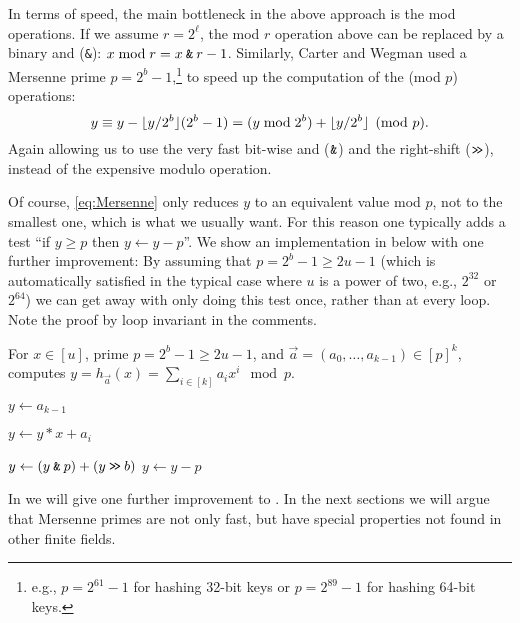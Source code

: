In terms of speed, the main bottleneck in the above approach is the mod operations.
If we assume $r=2^\ell$, the mod $r$ operation above can be replaced by a binary {\sc and} (\texttt{\&}): $x \bmod r = x \mathbin{\texttt{\&}} r-1$.
Similarly, Carter and Wegman \cite{carter77universal} used a
Mersenne prime $p=2^b-1$,\footnote{e.g., $p=2^{61}-1$ for hashing 32-bit keys or
$p=2^{89}-1$ for hashing 64-bit keys.}
to speed up the computation of the (mod $p$) operations:
\begin{equation}
	y%
	\equiv y - \floor{y/2^b}(2^b-1)
	= (y\bmod 2^{b}) + \floor{y/2^b}
	\pmod {p}.
	\label{eq:Mersenne}
\end{equation}
Again allowing us to use the very fast bit-wise {\sc and} ($\mathbin{\texttt{\&}}$) and the right-shift ($\mathbin{\texttt{>\!>}}$),
instead of the expensive modulo operation.

Of course, \eqref{eq:Mersenne} only reduces $y$ to an equivalent value mod $p$, not to the smallest one, which is what we usually want.
For this reason one typically adds a test ``if $y \ge p$ then $y \gets y - p$''.
We show an implementation in  below with one further improvement:
By assuming that $p=2^b-1\geq 2u-1$
(which is automatically satisfied in the typical case where $u$ is a power
of two, e.g., $2^{32}$ or $2^{64}$)
we can get away with only doing this test once, rather than at every loop.
Note the proof by loop invariant in the comments.

\begin{algorithm}[H]
	\caption{
	For $x\in [u]$, prime $p=2^b-1\geq 2u-1$,
	and $\vec a=(a_0,\ldots,a_{k-1})\in[p]^k$,
	computes $y=h_{\vec a}(x)=\sum_{i\in[k]}a_i x^i\mod p$.
	}\label{alg:Mersenne}
	\begin{algorithmic}
		\State $y\gets a_{k-1}$

		\State $y\gets y*x+a_i$

		\State $y\gets (y\mathbin{\texttt{\&}} p)+(y\mathbin{\texttt{>\!>}} b)$
		\EndFor
		\State $y\gets y-p$
		\EndIf
	\end{algorithmic}
\end{algorithm}


In  we will give one further improvement to .
In the next sections we will argue that Mersenne primes are not only fast, but have special properties not found in other finite fields.

